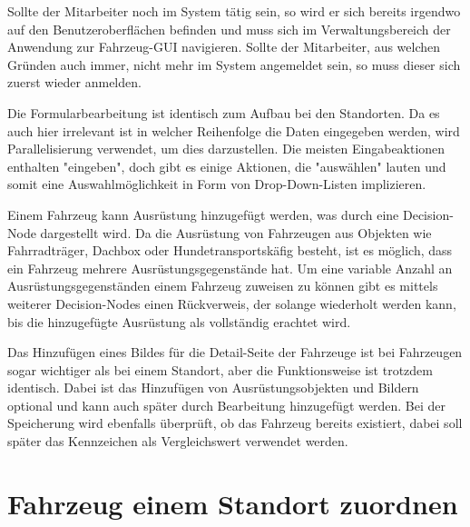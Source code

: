 Sollte der Mitarbeiter noch im System tätig sein, so wird er sich bereits irgendwo auf den Benutzeroberflächen befinden und muss sich im Verwaltungsbereich der Anwendung zur Fahrzeug-GUI navigieren. Sollte der Mitarbeiter, aus welchen Gründen auch immer, nicht mehr im System angemeldet sein, so muss dieser sich zuerst wieder anmelden. 


Die Formularbearbeitung ist identisch zum Aufbau bei den Standorten. Da es auch hier irrelevant ist in welcher Reihenfolge die Daten eingegeben werden, wird Parallelisierung verwendet, um dies darzustellen. Die meisten Eingabeaktionen enthalten "eingeben", doch gibt es einige Aktionen, die "auswählen" lauten und somit eine Auswahlmöglichkeit in Form von Drop-Down-Listen implizieren.


Einem Fahrzeug kann Ausrüstung hinzugefügt werden, was durch eine Decision-Node dargestellt wird. Da die Ausrüstung von Fahrzeugen aus Objekten wie Fahrradträger, Dachbox oder Hundetransportskäfig besteht, ist es möglich, dass ein Fahrzeug mehrere Ausrüstungsgegenstände hat. Um eine variable Anzahl an Ausrüstungsgegenständen einem Fahrzeug zuweisen zu können gibt es mittels weiterer Decision-Nodes einen Rückverweis, der solange wiederholt werden kann, bis die hinzugefügte Ausrüstung als vollständig erachtet wird. 


Das Hinzufügen eines Bildes für die Detail-Seite der Fahrzeuge ist bei Fahrzeugen sogar wichtiger als bei einem Standort, aber die Funktionsweise ist trotzdem identisch. Dabei ist das Hinzufügen von Ausrüstungsobjekten und Bildern optional und kann auch später durch Bearbeitung hinzugefügt werden. Bei der Speicherung wird ebenfalls überprüft, ob das Fahrzeug bereits existiert, dabei soll später das Kennzeichen als Vergleichswert verwendet werden. 

\newpage

\section{Fahrzeug einem Standort zuordnen}

